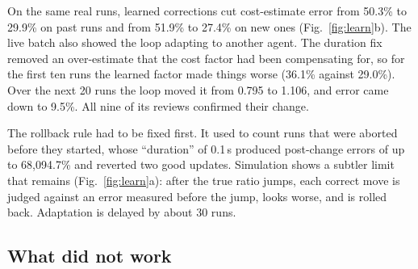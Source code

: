 \documentclass[runningheads]{llncs}
\begin{document}
On the same real runs, learned corrections cut cost-estimate error from 50.3\% to 29.9\% on past runs
and from 51.9\% to 27.4\% on new ones (Fig.~\ref{fig:learn}b). The live batch also showed the loop
adapting to another agent. The duration fix removed an over-estimate that the cost factor had been
compensating for, so for the first ten runs the learned factor made things worse (36.1\% against
29.0\%). Over the next 20 runs the loop moved it from 0.795 to 1.106, and error came down to 9.5\%.
All nine of its reviews confirmed their change.

The rollback rule had to be fixed first. It used to count runs that were aborted before they started,
whose ``duration'' of 0.1\,s produced post-change errors of up to 68{,}094.7\% and reverted two good
updates. Simulation shows a subtler limit that remains (Fig.~\ref{fig:learn}a): after the true ratio
jumps, each correct move is judged against an error measured before the jump, looks worse, and is rolled
back. Adaptation is delayed by about 30 runs.

\subsection{What did not work}
\label{sec:lessons}
\end{document}
